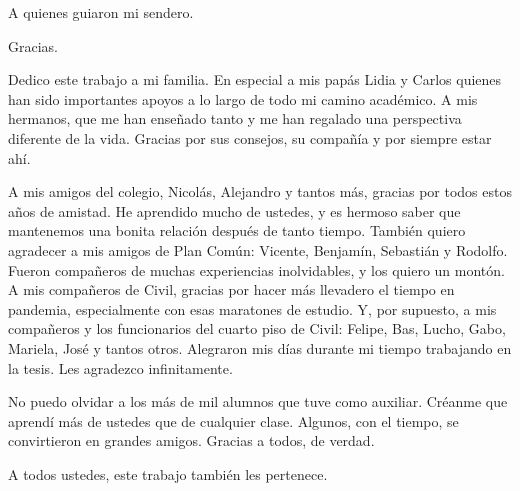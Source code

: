 \documentclass[
	spanish, %
	letterpaper, oneside
]{book}
\begin{document}
\begin{dedicatory}
	A quienes guiaron mi sendero.

	Gracias.
\end{dedicatory}

\begin{acknowledgments}

Dedico este trabajo a mi familia. En especial a mis papás Lidia y Carlos quienes han sido importantes apoyos a lo largo de todo mi camino académico. A mis hermanos, que me han enseñado tanto y me han regalado una perspectiva diferente de la vida. Gracias por sus consejos, su compañía y por siempre estar ahí.

A mis amigos del colegio, Nicolás, Alejandro y tantos más, gracias por todos estos años de amistad. He aprendido mucho de ustedes, y es hermoso saber que mantenemos una bonita relación después de tanto tiempo. También quiero agradecer a mis amigos de Plan Común: Vicente, Benjamín, Sebastián y Rodolfo. Fueron compañeros de muchas experiencias inolvidables, y los quiero un montón. A mis compañeros de Civil, gracias por hacer más llevadero el tiempo en pandemia, especialmente con esas maratones de estudio. Y, por supuesto, a mis compañeros y los funcionarios del cuarto piso de Civil: Felipe, Bas, Lucho, Gabo, Mariela, José y tantos otros. Alegraron mis días durante mi tiempo trabajando en la tesis. Les agradezco infinitamente.

No puedo olvidar a los más de mil alumnos que tuve como auxiliar. Créanme que aprendí más de ustedes que de cualquier clase. Algunos, con el tiempo, se convirtieron en grandes amigos. Gracias a todos, de verdad.

A todos ustedes, este trabajo también les pertenece.    
    
\end{acknowledgments}

\templateIndex

\templateFinalcfg

\renewcommand{\textbf}[1]{#1}













\end{document}
